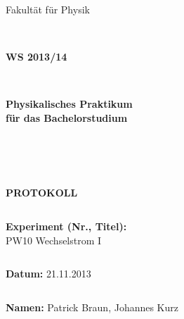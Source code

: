 \documentclass[12pt,a4paper]{article}
\begin{document}
\thispagestyle{empty}
			\begin{center}
			\Large{Fakultät für Physik}\\
			\end{center}
\begin{verbatim}


\end{verbatim}
			\begin{center}
			\textbf{\LARGE WS 2013/14}
			\end{center}
\begin{verbatim}


\end{verbatim}
			\begin{center}
			\textbf{\LARGE{Physikalisches Praktikum\\ für das Bachelorstudium}}
			\end{center}
\begin{verbatim}




\end{verbatim}

			\begin{center}
			\textbf{\LARGE{PROTOKOLL}}
			\end{center}
			
\begin{verbatim}

\end{verbatim}

			\begin{flushleft}
			\textbf{\Large{Experiment (Nr., Titel):}}\\
			\LARGE{PW10 Wechselstrom I}	
			\end{flushleft}

\begin{verbatim}

\end{verbatim}	
			\begin{flushleft}
			\textbf{\Large{Datum:}} \Large{21.11.2013}
			\end{flushleft}
			
\begin{verbatim}
\end{verbatim}
		\begin{flushleft}
			\textbf{\Large{Namen:}} \Large{Patrick Braun, Johannes Kurz}
			\end{flushleft}
\end{document}

